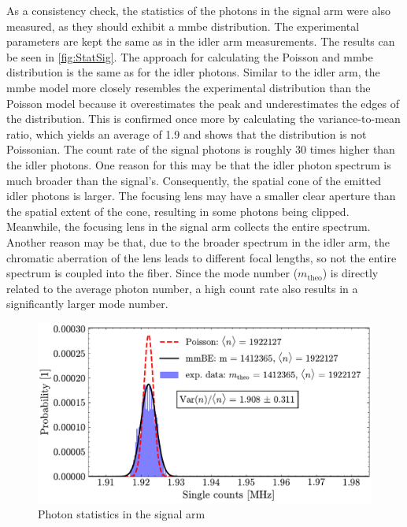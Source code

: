As a consistency check, the statistics of the photons in the signal arm were also measured, as they should exhibit a \acrshort{mmbe} distribution. The experimental parameters are kept the same as in the idler arm measurements. \newline
The results can be seen in \autoref{fig:StatSig}. The approach for calculating the Poisson and \acrshort{mmbe} distribution is the same as for the idler photons. Similar to the idler arm, the \acrshort{mmbe} model more closely resembles the experimental distribution than the Poisson model because it overestimates the peak and underestimates the edges of the distribution. This is confirmed once more by calculating the variance-to-mean ratio, which yields an average of 1.9 and shows that the distribution is not Poissonian. \newline
The count rate of the signal photons is roughly 30 times higher than the idler photons. One reason for this may be that the idler photon spectrum is much broader than the signal's. Consequently, the spatial cone of the emitted idler photons is larger. The focusing lens may have a smaller clear aperture than the spatial extent of the cone, resulting in some photons being clipped. Meanwhile, the focusing lens in the signal arm collects the entire spectrum. Another reason may be that, due to the broader spectrum in the idler arm, the chromatic aberration of the lens leads to different focal lengths, so not the entire spectrum is coupled into the fiber. Since the mode number ($m_{\mathrm{theo}}$) is directly related to the average photon number, a high count rate also results in a significantly larger mode number.
\begin{figure}[tb!]
	\centering
	\includegraphics[width=.9\textwidth]{Images/SingleStatisticsSignal_2.pdf}
	\caption{Photon statistics in the signal arm}
	\label{fig:StatSig}
\end{figure}

